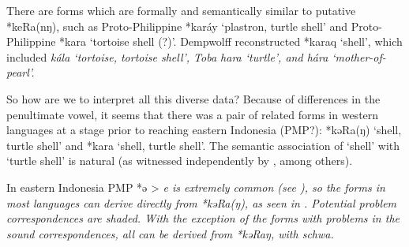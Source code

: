 There are forms which are formally
and semantically similar to putative *keRa(nŋ),
such as Proto-Philippine *karáy ‘plastron,
turtle shell’ and Proto-Philippine *kara ‘tortoise shell (?)’.
Dempwolff reconstructed *karaq ‘shell’,
which included  \it{kála} ‘tortoise,
tortoise shell’, Toba  \it{hara} ‘turtle’,
and  \it{hára} ‘mother-of-pearl’.

So how are we to interpret all this diverse data? Because of
differences in the penultimate vowel,
it seems that there was a pair of related forms in western languages
at a stage prior to reaching eastern Indonesia (PMP?): *kəRa(ŋ)
‘shell, turtle shell’ and *kara ‘shell, turtle shell’.
The semantic association of ‘shell’ with ‘turtle shell’ is natural
(as witnessed independently by , among others).

In eastern Indonesia PMP *ə > \it{e} is extremely common (see
), so the forms in most languages can derive directly from *kəRa(ŋ),
as seen in .
Potential problem correspondences are shaded.
With the exception of the forms with problems in the sound correspondences,
all can be derived from *kəRaŋ, with schwa.

